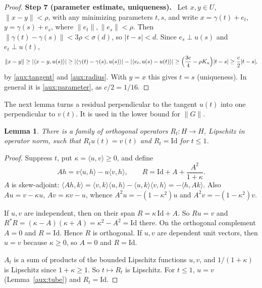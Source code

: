 \documentclass[11pt]{article}
\newcommand{\norm}[1]{\lVert #1\rVert}
\newcommand{\ip}[2]{\langle #1,#2\rangle}
\newcommand{\step}[1]{\par\smallskip\noindent\textbf{Step #1.}\ }
\newtheorem{lemma}[theorem]{Lemma}
\theoremstyle{definition}
\numberwithin{equation}{section}
\begin{document}
\begin{proof}
\step{7 (parameter estimate, uniqueness)} Let $x,y\in U$,
$\norm{x-y}<\rho$, with any minimizing parameters $t,s$, and write
$x=\gamma(t)+e_t$, $y=\gamma(s)+e_s$, where $\norm{e_t},\norm{e_s}<\rho$.
Then $\norm{\gamma(t)-\gamma(s)}<3\rho<\sigma(d)$, so $|t-s|<d$. Since
$e_s\perp u(s)$ and $e_t\perp u(t)$,
\[
 \norm{x-y}\ge|\ip{x-y}{u(s)}|
 \ge|\ip{\gamma(t)-\gamma(s)}{u(s)}|-|\ip{e_t}{u(s)-u(t)}|
 \ge\Bigl(\frac{3c}4-\rho K_u\Bigr)|t-s|\ge\frac c2|t-s|,
\]
by \eqref{aux:tangent} and \eqref{aux:radius}. With $y=x$ this gives $t=s$
(uniqueness). In general it is \eqref{aux:parameter}, as $c/2=1/16$.
\end{proof}

The next lemma turns a residual perpendicular to the tangent $u(t)$ into
one perpendicular to $v(t)$. It is used in the lower bound for $\norm{G}$.

\begin{lemma}\label{aux:rotation}
There is a family of orthogonal operators $R_t:H\to H$, Lipschitz in
operator norm, such that $R_tu(t)=v(t)$ and $R_t=\mathrm{Id}$ for $t\le1$.
\end{lemma}

\begin{proof}
Suppress $t$, put $\kappa=\ip uv\ge0$, and define
\[
 Ah=v\ip uh-u\ip vh,\qquad R=\mathrm{Id}+A+\frac{A^2}{1+\kappa}.
\]
$A$ is skew-adjoint: $\ip{Ah}{k}=\ip vk\ip uh-\ip uk\ip vh=-\ip h{Ak}$.
Also $Au=v-\kappa u$, $Av=\kappa v-u$, whence $A^2u=-(1-\kappa^2)u$ and
$A^2v=-(1-\kappa^2)v$.

If $u,v$ are independent, then on their span $R=\kappa\,\mathrm{Id}+A$. So
$Ru=v$ and $R^*R=(\kappa-A)(\kappa+A)=\kappa^2-A^2=\mathrm{Id}$ there. On
the orthogonal complement $A=0$ and $R=\mathrm{Id}$. Hence $R$ is
orthogonal. If $u,v$ are dependent unit vectors, then $u=v$ because
$\kappa\ge0$, so $A=0$ and $R=\mathrm{Id}$.

$A_t$ is a sum of products of the bounded Lipschitz functions $u,v$, and
$1/(1+\kappa)$ is Lipschitz since $1+\kappa\ge1$. So $t\mapsto R_t$ is
Lipschitz. For $t\le1$, $u=v$ (Lemma~\ref{aux:tube}) and $R_t=\mathrm{Id}$.
\end{proof}
\end{document}
